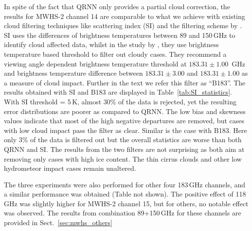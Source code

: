 \documentclass[amt, manuscript]{copernicus}
\begin{document}
In spite of the fact that QRNN only provides a partial cloud correction, the
results for MWHS-2 channel 14 are comparable to what we achieve with existing
cloud filtering techniques like scattering index (SI) and the filtering scheme
by \citet{buehler:aclou:07}. SI uses the differences of brightness temperatures
between 89 and 150\,GHz to identify cloud affected data, whilst in the study by
\citet{buehler:aclou:07}, they use brightness temperature based threshold to
filter out cloudy cases. They recommend a viewing angle dependent brightness
temperature threshold at $183.31\pm1.00$ \,GHz and brightness temperature
difference between $183.31\pm3.00$ and $183.31\pm 1.00$ as a measure of cloud
impact. Further in the text we refer this filter as ``B183''. The results
obtained with SI and B183 are displayed in Table~\ref{tab:SI_statistics}. With
SI threshold = 5\,K, almost 30\% of the data is rejected, yet the resulting
error distributions are poorer as compared to QRNN. The low bias and skewness
values indicate that most of the high negative departures are removed, but cases
with low cloud impact pass the filter as clear. Similar is the case with B183.
Here only 3\% of the data is filtered out but the overall statistics are worse
than both QRNN and SI. The results from the two filters are not surprising as
both aim at removing only cases with high ice content. The thin cirrus clouds
and other low hydrometeor impact cases remain unaltered.

The three experiments were also performed for other four 183\,GHz channels, and a similar performance was obtained (Table not shown). The positive effect of 118\,GHz was slightly higher for MWHS-2 channel 15, but for others, no notable effect was observed. The results from combination 89+150\,GHz for these channels are provided in Sect.~\ref{sec:mwhs_others} 
\end{document}
